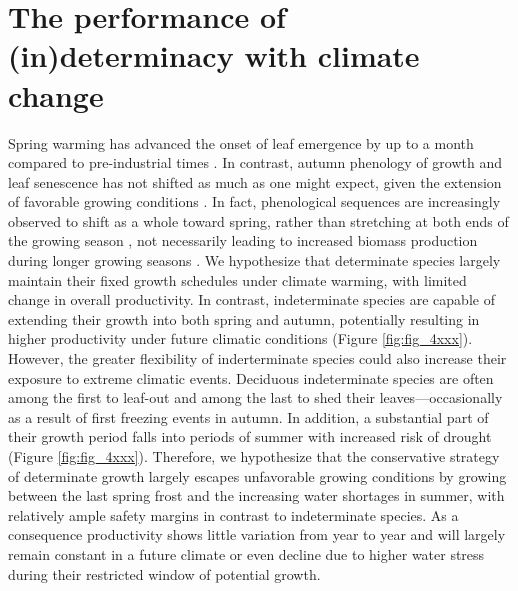 \documentclass{article}
\begin{document}
	
\section*{The performance of (in)determinacy with climate change} 

Spring warming has advanced the onset of leaf emergence by up to a month compared to pre-industrial times \citep{vitasseGreatAccelerationPlant2022b}. In contrast, autumn phenology of growth and leaf senescence has not shifted as much as one might expect, given the extension of favorable growing conditions  \citep{zaniIncreasedGrowingseasonProductivity2020b, zohnerEffectClimateWarming2023}. In fact, phenological sequences are increasingly observed to shift as a whole toward spring, rather than stretching at both ends of the growing season \citep{keenanTimingAutumnSenescence2015b}, not necessarily leading to increased biomass production during longer growing seasons \citep{zaniIncreasedGrowingseasonProductivity2020b}. We hypothesize that determinate species largely maintain their fixed growth schedules under climate warming, with limited change in overall productivity. In contrast, indeterminate species are capable of extending their growth into both spring and autumn, potentially resulting in higher productivity under future climatic conditions (Figure \ref{fig:fig_4xxx}). \\

However, the greater flexibility of inderterminate species could also increase their exposure to extreme climatic events. Deciduous indeterminate species are often among the first to leaf-out and among the last to shed their leaves---occasionally as a result of first freezing events in autumn. In addition, a substantial part of their growth period falls into periods of summer with increased risk of drought (Figure \ref{fig:fig_4xxx}). 
Therefore, we hypothesize that the conservative strategy of determinate growth largely escapes unfavorable growing conditions by growing between the last spring frost and the increasing water shortages in summer, with relatively ample safety margins in contrast to indeterminate species. As a consequence productivity shows little variation from year to year and will largely remain constant in a future climate or even decline due to higher water stress during their restricted window of potential growth. 
\end{document}
